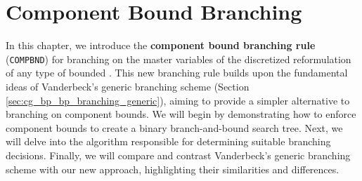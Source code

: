 \chapter{Component Bound Branching}\label{ch:cmpbnd}
In this chapter, we introduce the \textbf{component bound branching rule} (\texttt{COMPBND}) for branching on the master variables of the discretized reformulation of any type of bounded \IP{}. This new branching rule builds upon the fundamental ideas of Vanderbeck's generic branching scheme (Section \ref{sec:cg_bp_bp_branching_generic}), aiming to provide a simpler alternative to branching on component bounds. We will begin by demonstrating how to enforce component bounds to create a binary branch-and-bound search tree. Next, we will delve into the algorithm responsible for determining suitable branching decisions. Finally, we will compare and contrast Vanderbeck's generic branching scheme with our new approach, highlighting their similarities and differences.



